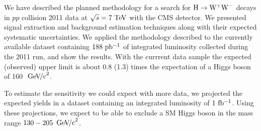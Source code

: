 We have described the planned methodology for a search for $\mathrm{H}\to\mathrm{W}^+\mathrm{W}^-$ decays in $pp$ collision 2011 data at
$\sqrt{s}=7~\mathrm{Te\kern -0.1em V}$ with the CMS detector. 
We presented signal extraction and background estimation techniques along with 
their expected systematic uncertainties. 
We applied the methodology described to the currently available dataset containing $188~\mathrm{pb^{-1}}$ of integrated luminosity
collected during the 2011 run, and show the results. With the currrent data sample the expected 
(observed) upper limit is about 0.8 (1.3) times the expectation of a Higgs boson of 160~$\,\mathrm{Ge\kern -0.1em V\!/c}^2$.

To estimate the sensitivity we could expect with more data, we projected the expected yields 
in a dataset containing an integrated luminosity of $1~\mathrm{fb^{-1}}$.
Using these projections, we expect to be able to exclude a SM Higgs boson in the mass range $130-205~ \,\mathrm{Ge\kern -0.1em V\!/c}^2$.




